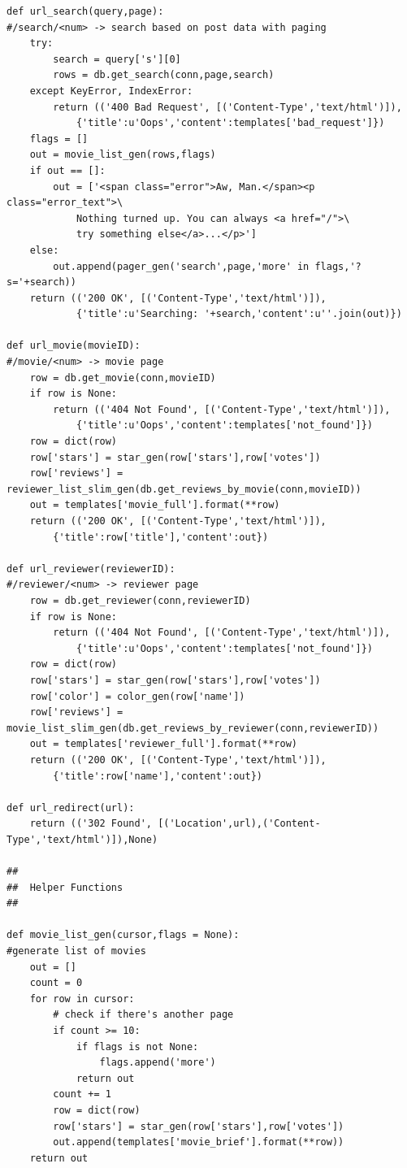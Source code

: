 \documentclass[10pt,a4paper]{scrreprt}
\begin{document}
\begin{appendices}
\begin{verbatim}
def url_search(query,page):
#/search/<num> -> search based on post data with paging
    try:
        search = query['s'][0]
        rows = db.get_search(conn,page,search)
    except KeyError, IndexError:
        return (('400 Bad Request', [('Content-Type','text/html')]),
            {'title':u'Oops','content':templates['bad_request']})
    flags = []
    out = movie_list_gen(rows,flags)
    if out == []:
        out = ['<span class="error">Aw, Man.</span><p class="error_text">\
            Nothing turned up. You can always <a href="/">\
            try something else</a>...</p>']
    else:
        out.append(pager_gen('search',page,'more' in flags,'?s='+search))
    return (('200 OK', [('Content-Type','text/html')]),
            {'title':u'Searching: '+search,'content':u''.join(out)})

def url_movie(movieID):
#/movie/<num> -> movie page
    row = db.get_movie(conn,movieID)
    if row is None:
        return (('404 Not Found', [('Content-Type','text/html')]),
            {'title':u'Oops','content':templates['not_found']})
    row = dict(row)
    row['stars'] = star_gen(row['stars'],row['votes'])
    row['reviews'] = reviewer_list_slim_gen(db.get_reviews_by_movie(conn,movieID))
    out = templates['movie_full'].format(**row)
    return (('200 OK', [('Content-Type','text/html')]),
        {'title':row['title'],'content':out})

def url_reviewer(reviewerID):
#/reviewer/<num> -> reviewer page
    row = db.get_reviewer(conn,reviewerID)
    if row is None:
        return (('404 Not Found', [('Content-Type','text/html')]),
            {'title':u'Oops','content':templates['not_found']})
    row = dict(row)
    row['stars'] = star_gen(row['stars'],row['votes'])
    row['color'] = color_gen(row['name'])
    row['reviews'] = movie_list_slim_gen(db.get_reviews_by_reviewer(conn,reviewerID))
    out = templates['reviewer_full'].format(**row)
    return (('200 OK', [('Content-Type','text/html')]),
        {'title':row['name'],'content':out})

def url_redirect(url):
    return (('302 Found', [('Location',url),('Content-Type','text/html')]),None)

##
##  Helper Functions
##

def movie_list_gen(cursor,flags = None):
#generate list of movies
    out = []
    count = 0
    for row in cursor:
        # check if there's another page
        if count >= 10:
            if flags is not None:
                flags.append('more')
            return out
        count += 1
        row = dict(row)
        row['stars'] = star_gen(row['stars'],row['votes'])
        out.append(templates['movie_brief'].format(**row))
    return out


\end{verbatim}
\end{appendices}
\end{document}
